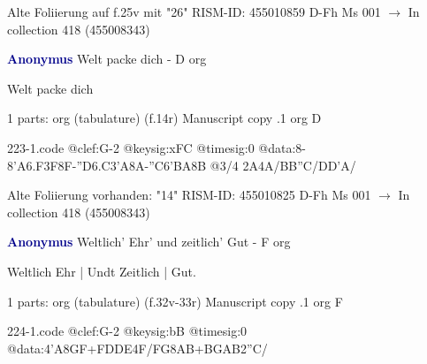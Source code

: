 \documentclass[twocolumn]{book}
\begin{document}
\newline Alte Foliierung auf f.25v mit "26"
\newline RISM-ID: 455010859
\newline D-Fh  Ms 001
\newline $\rightarrow$ In collection 418 (455008343)
      
\newline \par \vspace{7pt} \textcolor{darkblue}{\textbf{Anonymus  }}
\newline Welt packe dich - D
\newline org
\newline \begin{itshape}[f.14r, at left:] Welt packe dich\end{itshape} 
\newline \textcolor{darkblue}{}  1 parts: org (tabulature)  (f.14r)
\newline Manuscript copy
.1  org  D  
\begin{filecontents*}{223-1.code}
@clef:G-2
@keysig:xFC
@timesig:0
@data:8-{8'A6.F3F}8F-{''D6.C3'A}8A-''C{6'BA}8B @3/4 2A4A/BB''C/DD'A/
\end{filecontents*}
\newline
%

\newline Alte Foliierung vorhanden: "14"
\newline RISM-ID: 455010825
\newline D-Fh  Ms 001
\newline $\rightarrow$ In collection 418 (455008343)
      
\newline \par \vspace{7pt} \textcolor{darkblue}{\textbf{Anonymus  }}
\newline Weltlich' Ehr' und zeitlich' Gut - F
\newline org
\newline \begin{itshape}[f.32v, at left:] Weltlich Ehr | Undt Zeitlich | Gut.\end{itshape} 
\newline \textcolor{darkblue}{}  1 parts: org (tabulature)  (f.32v-33r)
\newline Manuscript copy
.1  org  F  
\begin{filecontents*}{224-1.code}
@clef:G-2
@keysig:bB
@timesig:0
@data:4'A{8GF+}{FDDE}4F/FG{8AB+}{BGAB}2''C/
\end{filecontents*}
\newline
%
\end{document}

